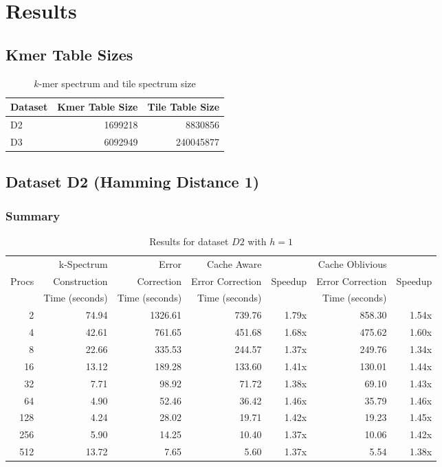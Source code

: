 \documentclass[integrals, nointegrals, article, 12pt, a4paper]{article}
\begin{document}
\section{Results}
\label{sec-3}
\subsection{Kmer Table Sizes}
\label{sec-3-1}

\begin{table}[htb]
\caption{\label{tab:spectrum}$k$-mer spectrum and tile spectrum size}
\centering
\begin{tabular}{lrr}
\hline
Dataset & Kmer Table Size & Tile Table Size\\
\hline
D2 & 1699218 & 8830856\\
D3 & 6092949 & 240045877\\
\hline
\end{tabular}
\end{table}


\subsection{Dataset D2 (Hamming Distance 1)}
\label{sec-3-2}
\subsubsection{Summary}
\label{sec-3-2-1}

\begin{table}[htb]
\caption{\label{tab:d2h1run}Results for dataset $D2$ with $h = 1$}
\centering
\begin{tabular}{rrrrrrr}
\hline
 & k-Spectrum & Error & Cache Aware &  & Cache Oblivious & \\
Procs & Construction & Correction & Error Correction & Speedup & Error Correction & Speedup\\
 & Time (seconds) & Time (seconds) & Time (seconds) &  & Time (seconds) & \\
\hline
2 & 74.94 & 1326.61 & 739.76 & 1.79x & 858.30 & 1.54x\\
4 & 42.61 & 761.65 & 451.68 & 1.68x & 475.62 & 1.60x\\
8 & 22.66 & 335.53 & 244.57 & 1.37x & 249.76 & 1.34x\\
16 & 13.12 & 189.28 & 133.60 & 1.41x & 130.01 & 1.44x\\
32 & 7.71 & 98.92 & 71.72 & 1.38x & 69.10 & 1.43x\\
64 & 4.90 & 52.46 & 36.42 & 1.46x & 35.79 & 1.46x\\
128 & 4.24 & 28.02 & 19.71 & 1.42x & 19.23 & 1.45x\\
256 & 5.90 & 14.25 & 10.40 & 1.37x & 10.06 & 1.42x\\
512 & 13.72 & 7.65 & 5.60 & 1.37x & 5.54 & 1.38x\\
\hline
\end{tabular}
\end{table}
\end{document}
